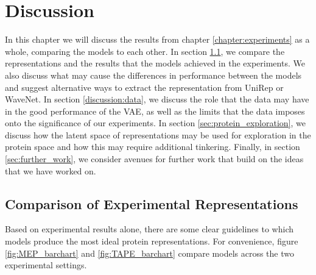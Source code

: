 \chapter{Discussion}
\label{chapter:discussion}


In this chapter we will discuss the results from chapter \ref{chapter:experiments} as a whole, comparing the models to each other. In section \ref{sec:comparison_representations}, we compare the representations and the results that the models achieved in the experiments. We also discuss what may cause the differences in performance between the models and suggest alternative ways to extract the representation from UniRep or WaveNet. In section \ref{discussion:data}, we discuss the role that the data may have in the good performance of the VAE, as well as the limits that the data imposes onto the significance of our experiments. In section \ref{sec:protein_exploration}, we discuss how the latent space of representations may be used for exploration in the protein space and how this may require additional tinkering. Finally, in section \ref{sec:further_work}, we consider avenues for further work that build on the ideas that we have worked on.



\section{Comparison of Experimental Representations}
\label{sec:comparison_representations}
Based on experimental results alone, there are some clear guidelines to which models produce the most ideal protein representations. For convenience, figure \ref{fig:MEP_barchart} and \ref{fig:TAPE_barchart} compare models across the two experimental settings.

